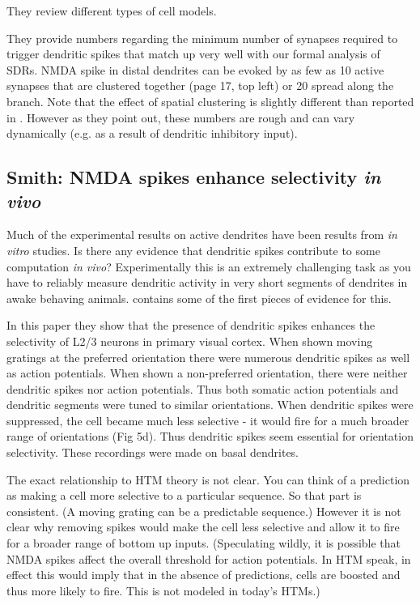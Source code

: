 \documentclass{article} %
\begin{document}
They review different types of cell models.

They provide numbers regarding the minimum number of synapses required to
trigger dendritic spikes that match up very well with our formal analysis of
SDRs.  NMDA spike in distal dendrites can be evoked by as few as 10 active
synapses that are clustered together (page 17, top left) or 20 spread along
the branch. Note that the effect of spatial clustering is slightly different
than reported in \cite{Losonczy2006}.  However as they point out,
these numbers are rough and can vary dynamically (e.g. as a result of
dendritic inhibitory input).

\subsection{Smith: NMDA spikes enhance selectivity \emph{in vivo}}

Much of the experimental results on active dendrites have been results from
\emph{in vitro} studies.  Is there any evidence that dendritic spikes contribute
to some computation \emph{in vivo}? Experimentally this is an extremely
challenging task as you have to reliably measure dendritic activity in very
short segments of dendrites in awake behaving animals. \cite{Smith2013} contains
some of the first pieces of evidence for this.

In this paper they show that the presence of dendritic spikes enhances the
selectivity of L2/3 neurons in primary visual cortex. When shown moving gratings
at the preferred orientation there were numerous dendritic spikes as well as
action potentials. When shown a non-preferred orientation, there were neither
dendritic spikes nor action potentials. Thus both somatic action potentials
and dendritic segments were tuned to similar orientations.  When dendritic spikes
were suppressed, the cell became much less selective - it would fire for a much
broader range of orientations (Fig 5d). Thus dendritic spikes seem essential
for orientation selectivity.  These recordings were made on basal dendrites.

The exact relationship to HTM theory is not clear. You can think of a prediction
as making a cell more selective to a particular sequence. So that part is
consistent. (A moving grating can be a predictable sequence.) However it is not
clear why removing spikes would make the cell less selective and allow it to
fire for a broader range of bottom up inputs. (Speculating wildly, it is
possible that NMDA spikes affect the overall threshold for action potentials. In
HTM speak, in effect this would imply that in the absence of predictions, cells
are boosted and thus more likely to fire. This is not modeled in today's HTMs.)
\end{document}
